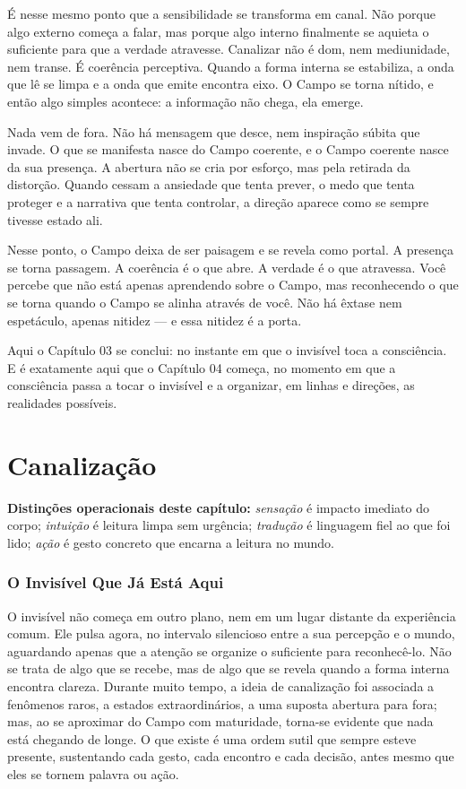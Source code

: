 \documentclass[12pt]{book}
\begin{document}
É nesse mesmo ponto que a sensibilidade se transforma em canal. Não porque algo externo começa a falar, mas porque algo interno finalmente se aquieta o suficiente para que a verdade atravesse. Canalizar não é dom, nem mediunidade, nem transe. É coerência perceptiva. Quando a forma interna se estabiliza, a onda que lê se limpa e a onda que emite encontra eixo. O Campo se torna nítido, e então algo simples acontece: a informação não chega, ela emerge.

Nada vem de fora. Não há mensagem que desce, nem inspiração súbita que invade. O que se manifesta nasce do Campo coerente, e o Campo coerente nasce da sua presença. A abertura não se cria por esforço, mas pela retirada da distorção. Quando cessam a ansiedade que tenta prever, o medo que tenta proteger e a narrativa que tenta controlar, a direção aparece como se sempre tivesse estado ali.

Nesse ponto, o Campo deixa de ser paisagem e se revela como portal. A presença se torna passagem. A coerência é o que abre. A verdade é o que atravessa. Você percebe que não está apenas aprendendo sobre o Campo, mas reconhecendo o que se torna quando o Campo se alinha através de você. Não há êxtase nem espetáculo, apenas nitidez --- e essa nitidez é a porta.

Aqui o Capítulo 03 se conclui: no instante em que o invisível toca a consciência. E é exatamente aqui que o Capítulo 04 começa, no momento em que a consciência passa a tocar o invisível e a organizar, em linhas e direções, as realidades possíveis.

\chapter{Canalização}

\textbf{Distinções operacionais deste capítulo:} \textit{sensação} é impacto imediato do corpo; \textit{intuição} é leitura limpa sem urgência; \textit{tradução} é linguagem fiel ao que foi lido; \textit{ação} é gesto concreto que encarna a leitura no mundo.

\subsection*{O Invisível Que Já Está Aqui}

O invisível não começa em outro plano, nem em um lugar distante da experiência comum. Ele pulsa agora, no intervalo silencioso entre a sua percepção e o mundo, aguardando apenas que a atenção se organize o suficiente para reconhecê-lo. Não se trata de algo que se recebe, mas de algo que se revela quando a forma interna encontra clareza. Durante muito tempo, a ideia de canalização foi associada a fenômenos raros, a estados extraordinários, a uma suposta abertura para fora; mas, ao se aproximar do Campo com maturidade, torna-se evidente que nada está chegando de longe. O que existe é uma ordem sutil que sempre esteve presente, sustentando cada gesto, cada encontro e cada decisão, antes mesmo que eles se tornem palavra ou ação.
\end{document}
